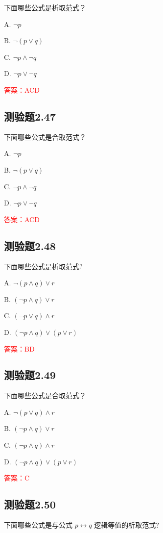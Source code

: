 \documentclass[UTF8, heading=true]{ctexart}
\begin{document}
下面哪些公式是析取范式？

A. $ \neg p$

B. $\neg(p \vee q)$

C. $\neg p \wedge \neg q$

D. $ \neg p \vee \neg q$

\textcolor{red}{答案：ACD}

\subsection{测验题2.47}

下面哪些公式是合取范式？

A. $ \neg p$

B. $\neg(p \vee q)$

C. $\neg p \wedge \neg q$

D. $ \neg p \vee \neg q$

\textcolor{red}{答案：ACD}

\subsection{测验题2.48}

下面哪些公式是析取范式?

A. $\neg(p \wedge q) \vee r$

B. $(\neg p \wedge q) \vee r$

C. $(\neg p \vee q) \wedge r$

D. $(\neg p \wedge q) \vee(p \vee r)$

\textcolor{red}{答案：BD}


\subsection{测验题2.49}

下面哪些公式是合取范式？

A. $ \neg(p \vee q) \wedge r$

B. $(\neg p \wedge q) \vee r$

C. $(\neg p \wedge q) \wedge r$

D. $(\neg p \wedge q) \vee(p \vee r)$

\textcolor{red}{答案：C}

\subsection{测验题2.50}

下面哪些公式是与公式 $p \leftrightarrow q$ 逻辑等值的析取范式?
\end{document}

